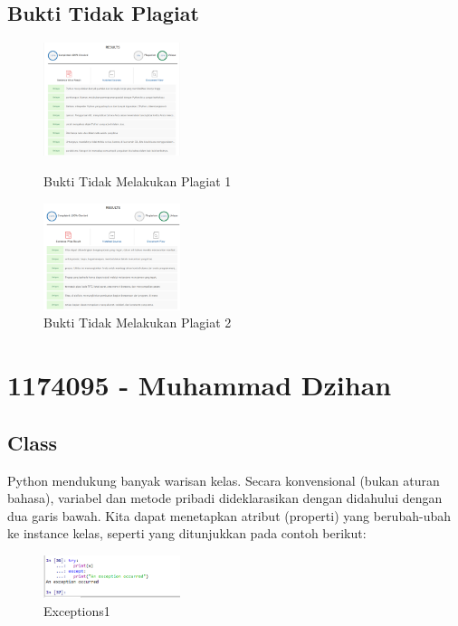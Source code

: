 \subsection{Bukti Tidak Plagiat}
\begin{figure}[H]
	\includegraphics[width=4cm]{figures/kelompok1/1/tomy/plagiat_tomy_1.PNG}
	\centering
	\caption{Bukti Tidak Melakukan Plagiat 1}
    \includegraphics[width=4cm]{figures/kelompok1/1/tomy/plagiat_tomy_2.PNG}
	\centering
	\caption{Bukti Tidak Melakukan Plagiat 2}
\end{figure}
\section{1174095 - Muhammad Dzihan}
\subsection{Class}
Python mendukung banyak warisan kelas. Secara konvensional (bukan aturan bahasa), variabel dan metode pribadi dideklarasikan dengan didahului dengan dua garis bawah. Kita dapat menetapkan atribut (properti) yang berubah-ubah ke instance kelas, seperti yang ditunjukkan pada contoh berikut:
\hfill\break


\hfill\break
	\begin{figure}[H]
		\centering
		\includegraphics[width=4cm]{figures/kelompok1/1/dzihan/class1.PNG}
		\caption{Exceptions1}
	\end{figure}
\hfill\break


